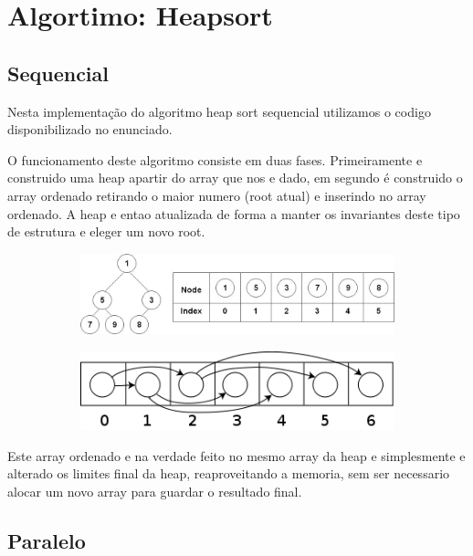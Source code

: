 \documentclass{article}
\begin{document}
\section{Algortimo: Heapsort} 

\subsection{Sequencial}
Nesta implementação do algoritmo heap sort sequencial utilizamos o codigo disponibilizado no enunciado. 
\par  O funcionamento deste algoritmo consiste em duas fases. Primeiramente e construido uma heap apartir do array  que nos e dado, em segundo é construido o array ordenado retirando o maior numero (root atual) e inserindo no array ordenado. A heap e entao atualizada de forma a manter os invariantes deste tipo de estrutura e eleger um novo root.

\begin{figure}[!htb]
  \centering
  \begin{subfigure}{.5\textwidth}
    \centering
    \includegraphics[width=.8\linewidth]{Binary_Heap_with_Array_Implementation.JPG}
  \end{subfigure}%
  \begin{subfigure}{.5\textwidth}
    \centering
    \includegraphics[width=.8\linewidth]{370px-Binary_tree_in_array.png}
  \end{subfigure}
\end{figure}

\par Este array ordenado e na verdade feito no mesmo array da heap e simplesmente e alterado os limites final da heap, reaproveitando a memoria, sem ser necessario alocar um novo array para guardar o resultado final.


\subsection{Paralelo}
\end{document}
